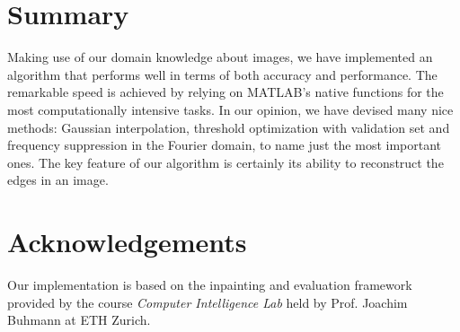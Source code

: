 \documentclass[10pt,conference,compsocconf]{IEEEtran}
\begin{document}
\section{Summary}
Making use of our domain knowledge about images, we have implemented an algorithm that performs well in terms of both accuracy and performance. The remarkable speed is achieved by relying on MATLAB's native functions for the most computationally intensive tasks. In our opinion, we have devised many nice methods: Gaussian interpolation, threshold optimization with validation set and frequency suppression in the Fourier domain, to name just the most important ones. The key feature of our algorithm is certainly its ability to reconstruct the edges in an image.

\section*{Acknowledgements}
Our implementation is based on the inpainting and evaluation framework provided by the course \emph{Computer Intelligence Lab} held by Prof. Joachim Buhmann at ETH Zurich.



\end{document}
